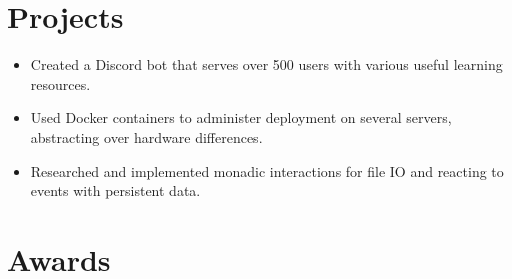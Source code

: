 \documentclass[
	9pt, %
]{FreemanCV}
\begin{document}
\begin{paracol}{2}

\section{Projects}
{
	\begin{itemize}[noitemsep, topsep=0pt, partopsep=0pt, leftmargin=8pt, before =\leavevmode\vspace*{-\baselineskip}]
		\item Created a Discord bot that serves over 500 users with various useful learning resources.
		\item Used Docker containers to administer deployment on several servers, abstracting over hardware differences.
		\item Researched and implemented monadic interactions for file IO and reacting to events with persistent data.
	\end{itemize}
}


\section{Awards}




\end{paracol}
\end{document}

